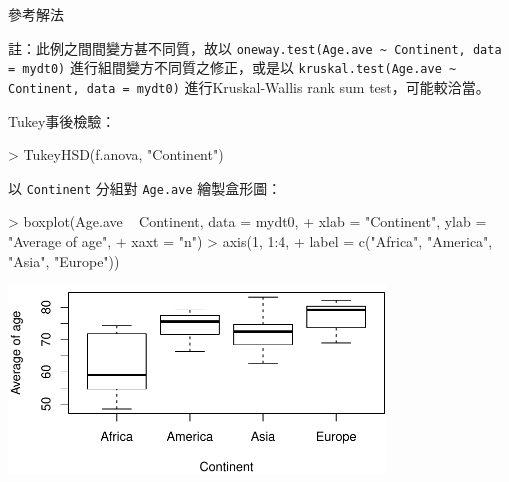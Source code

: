 \documentclass[14pt, aspectratio=43]{beamer}
\begin{document}
\begin{frame}{參考解法}
\begin{minipage}{1\textwidth}
\tiny 註：此例之間間變方甚不同質，故以 \verb+oneway.test(Age.ave ~ Continent, data = mydt0)+ 進行組間變方不同質之修正，或是以 \verb+kruskal.test(Age.ave ~ Continent, data = mydt0)+ 進行Kruskal-Wallis rank sum test，可能較洽當。
\end{minipage}

\framebreak

Tukey事後檢驗：
\begin{RC}
> TukeyHSD(f.anova, "Continent")
\end{RC}

\framebreak

以 \verb+Continent+ 分組對 \verb+Age.ave+ 繪製盒形圖：
\begin{RC}
> boxplot(Age.ave ~ Continent, data = mydt0,
+         xlab = "Continent", ylab = "Average of age",
+         xaxt = "n")
> axis(1, 1:4, 
+      label = c("Africa", "America", "Asia", "Europe"))
\end{RC}
\begin{center}\includegraphics[width=0.75\textwidth]{Rplot-test-anova.pdf}\end{center}


\end{frame}
\end{document}
